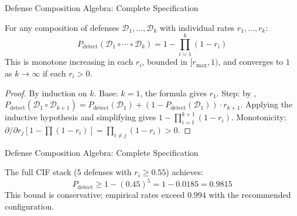 \documentclass[
  ignorenonframetext,
]{beamer}
\providecommand{\cref}[1]{\texttt{\detokenize{#1}}}
\begin{document}
\begin{frame}[allowframebreaks]{Defense Composition Algebra: Complete
Specification}
\begin{theorem}
\label{thm:composition-bound}
For any composition of defenses $\mathcal{D}_1, \ldots, \mathcal{D}_k$ with individual rates $r_1, \ldots, r_k$:
\begin{equation}
\label{eq:composition-bound}
P_{\text{detect}}(\mathcal{D}_1 \circ \cdots \circ \mathcal{D}_k) = 1 - \prod_{i=1}^{k}(1 - r_i)
\end{equation}
This is monotone increasing in each $r_i$, bounded in $[r_{\max}, 1)$, and converges to $1$ as $k \to \infty$ if each $r_i > 0$.
\end{theorem}

\begin{proof}
By induction on $k$. Base: $k=1$, the formula gives $r_1$. Step: by \cref{thm:series-detection}, $P_{\text{detect}}(\mathcal{D}_1 \circ \mathcal{D}_{k+1}) = P_{\text{detect}}(\mathcal{D}_1) + (1 - P_{\text{detect}}(\mathcal{D}_1)) \cdot r_{k+1}$. Applying the inductive hypothesis and simplifying gives $1 - \prod_{i=1}^{k+1}(1-r_i)$. Monotonicity: $\partial/\partial r_j [1 - \prod(1-r_i)] = \prod_{i \neq j}(1-r_i) > 0$.
\end{proof}

\end{frame}

\begin{frame}[allowframebreaks]{Defense Composition Algebra: Complete
Specification}
\begin{corollary}
\label{cor:layered-defense}
The full CIF stack (5 defenses with $r_i \geq 0.55$) achieves:
\begin{equation}
\label{eq:layered-guarantee}
P_{\text{detect}} \geq 1 - (0.45)^5 = 1 - 0.0185 = 0.9815
\end{equation}
This bound is conservative; empirical rates exceed $0.994$ with the recommended configuration.
\end{corollary}
\end{frame}
\end{document}
